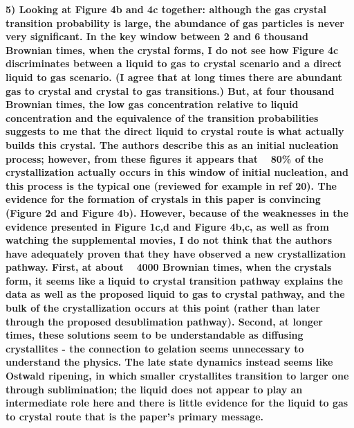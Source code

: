 \documentclass[11pt]{article}
\begin{document}
{\bf
5) Looking at Figure 4b and 4c together: although the gas crystal transition probability is large, the abundance of gas particles is never very significant. In the key window between 2 and 6 thousand Brownian times, when the crystal forms, I do not see how Figure 4c discriminates between a liquid to gas to crystal scenario and a direct liquid to gas scenario. (I agree that at long times there are abundant gas to crystal and crystal to gas transitions.) But, at four thousand Brownian times, the low gas concentration relative to liquid concentration and the equivalence of the transition probabilities suggests to me that the direct liquid to crystal route is what actually builds this crystal. The authors describe this as an initial nucleation process; however, from these figures it appears that ~ 80\% of the crystallization actually occurs in this window of initial nucleation, and this process is the typical one (reviewed for example in ref 20).
The evidence for the formation of crystals in this paper is convincing (Figure 2d and Figure 4b). However, because of the weaknesses in the evidence presented in Figure 1c,d and Figure 4b,c, as well as from watching the supplemental movies, I do not think that the authors have adequately proven that they have observed a new crystallization pathway. First, at about ~ 4000 Brownian times, when the crystals form, it seems like a liquid to crystal transition pathway explains the data as well as the proposed liquid to gas to crystal pathway, and the bulk of the crystallization occurs at this point (rather than later through the proposed desublimation pathway). Second, at longer times, these solutions seem to be understandable as diffusing crystallites - the connection to gelation seems unnecessary to understand the physics. The late state dynamics instead seems like Ostwald ripening, in which smaller crystallites transition to larger one through sublimination; the liquid does not appear to play an intermediate 
role here and there is little evidence for the liquid to gas to crystal route that is the paper's primary message.
}



\bigskip
\doublespacing
\end{document}
